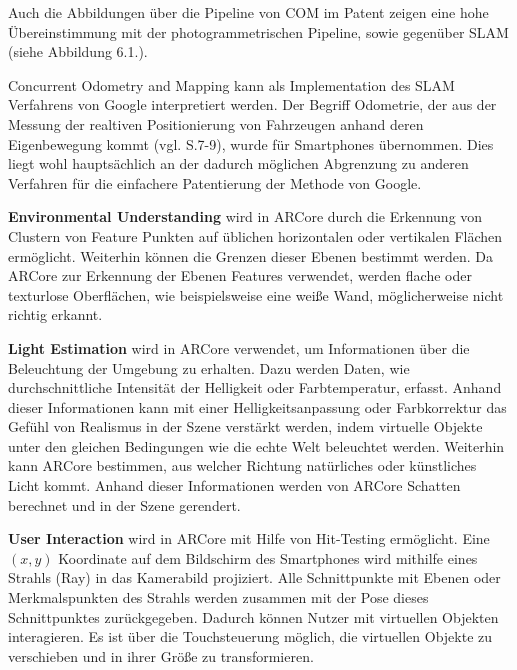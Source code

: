Auch die Abbildungen über die Pipeline von COM im Patent zeigen eine hohe Übereinstimmung mit der photogrammetrischen Pipeline, sowie gegenüber SLAM (siehe Abbildung 6.1.). 

Concurrent Odometry and Mapping kann als Implementation des SLAM Verfahrens von Google interpretiert werden. Der Begriff Odometrie, der aus der Messung der realtiven Positionierung von Fahrzeugen anhand deren Eigenbewegung kommt (vgl. \cite{odometrie} S.7-9), wurde für Smartphones übernommen. Dies liegt wohl hauptsächlich an der dadurch möglichen Abgrenzung zu anderen Verfahren für die einfachere Patentierung der Methode von Google. 


\textbf{Environmental Understanding} wird in ARCore durch die Erkennung von Clustern von Feature Punkten auf üblichen horizontalen oder vertikalen Flächen ermöglicht. Weiterhin können die Grenzen dieser Ebenen bestimmt werden. Da ARCore zur Erkennung der Ebenen Features verwendet, werden flache oder texturlose Oberflächen, wie beispielsweise eine weiße Wand, möglicherweise nicht richtig erkannt. 

\textbf{Light Estimation} wird in ARCore verwendet, um Informationen über die Beleuchtung der Umgebung zu erhalten. Dazu werden Daten, wie durchschnittliche Intensität der Helligkeit oder Farbtemperatur, erfasst. Anhand dieser Informationen kann mit einer Helligkeitsanpassung oder Farbkorrektur das Gefühl von Realismus in der Szene verstärkt werden, indem virtuelle Objekte unter den gleichen Bedingungen wie die echte Welt beleuchtet werden. Weiterhin kann ARCore bestimmen, aus welcher Richtung natürliches oder künstliches Licht kommt. Anhand dieser Informationen werden von ARCore Schatten berechnet und in der Szene gerendert.

\textbf{User Interaction} wird in ARCore mit Hilfe von \glqq Hit-Testing\grqq{} ermöglicht. Eine $(x,y)$ Koordinate auf dem Bildschirm des Smartphones wird mithilfe eines Strahls (Ray) in das Kamerabild projiziert. Alle Schnittpunkte mit Ebenen oder Merkmalspunkten des Strahls werden zusammen mit der Pose dieses Schnittpunktes zurückgegeben. Dadurch können Nutzer mit virtuellen Objekten interagieren. Es ist über die Touchsteuerung möglich, die virtuellen Objekte zu verschieben und in ihrer Größe zu transformieren. 

